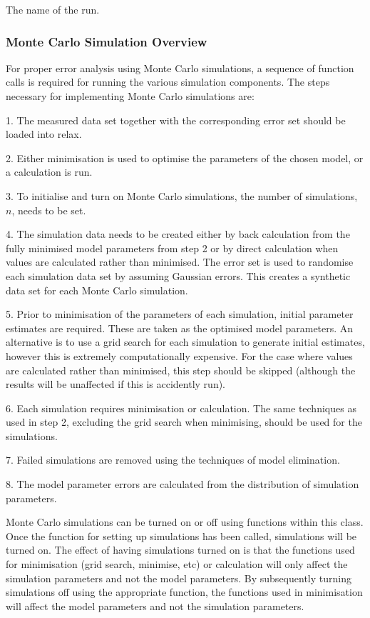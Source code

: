   The name of the run.


\subsubsection{Monte Carlo Simulation Overview}

For proper error analysis using Monte Carlo simulations, a sequence of function calls is
required for running the various simulation components.  The steps necessary for
implementing Monte Carlo simulations are:

1.  The measured data set together with the corresponding error set should be loaded into
relax.

2.  Either minimisation is used to optimise the parameters of the chosen model, or a
calculation is run.

3.  To initialise and turn on Monte Carlo simulations, the number of simulations, $n$, needs
to be set.

4.  The simulation data needs to be created either by back calculation from the fully
minimised model parameters from step 2 or by direct calculation when values are calculated
rather than minimised.  The error set is used to randomise each simulation data set by
assuming Gaussian errors.  This creates a synthetic data set for each Monte Carlo
simulation.

5.  Prior to minimisation of the parameters of each simulation, initial parameter estimates
are required.  These are taken as the optimised model parameters.  An alternative is to use
a grid search for each simulation to generate initial estimates, however this is extremely
computationally expensive.  For the case where values are calculated rather than minimised,
this step should be skipped (although the results will be unaffected if this is accidently
run).

6.  Each simulation requires minimisation or calculation.  The same techniques as used in
step 2, excluding the grid search when minimising, should be used for the simulations.

7.  Failed simulations are removed using the techniques of model elimination.

8.  The model parameter errors are calculated from the distribution of simulation
parameters.


Monte Carlo simulations can be turned on or off using functions within this class.  Once the
function for setting up simulations has been called, simulations will be turned on.  The
effect of having simulations turned on is that the functions used for minimisation (grid
search, minimise, etc) or calculation will only affect the simulation parameters and not the
model parameters.  By subsequently turning simulations off using the appropriate function,
the functions used in minimisation will affect the model parameters and not the simulation
parameters.


